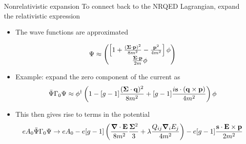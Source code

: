\documentclass[11ppt]{beamer}
\newcommand{\beqa}{\begin{eqnarray*} }
\newcommand{\eeqa}{\end{eqnarray*} }
\begin{document}
\begin{frame}{Nonrelativistic expansion} %
To connect back to the NRQED Lagrangian, expand the relativistic expression
\begin{itemize}

\item The wave functions are approximated

\scriptsize
\[
	\Psi \approx \begin{pmatrix}
		\left[1 +  \frac{ (\mathbf{\Sigma} \cdot \mathbf{p})^2}{8m^2} - \frac{\mathbf{p}^2}{4m^2} \right]	\phi	\\
		\frac{\mathbf{\Sigma} \cdot \mathbf{p}}{2m} \phi
	\end{pmatrix}
\] 
\normalsize
\item Example: expand the zero component of the current as
\scriptsize
\[
	\bar{\Psi} \Gamma_0 \Psi \approx
			\phi^\dagger \left( 1 - [g-1]\frac{ (\mathbf{\Sigma} \cdot \mathbf{q})^2}{8m^2} + [g-1]\frac{ i \mathbf{s} \cdot (\mathbf{q} \times \mathbf{p}) }{4m^2} \right ) \phi
\]
\normalsize
\item This then gives rise to terms in the potential
\scriptsize
\[
eA_0 \bar{\Psi} \Gamma_0 \Psi \to
eA_0 - e [g-1] \left(  \frac{\v{\grad} \cdot \v{E}}{8m^2} \frac{\v{\Sigma}^2}{3}  + \lambda \frac{Q_{ij} \grad_i E_j}{4m^2} \right ) - e[g-1] \frac{ \v{s} \cdot \v{E} \times \v{p} }{2m^2}
\]
\normalsize
\end{itemize}
\end{frame}


% 
% 
% 
\end{document}
